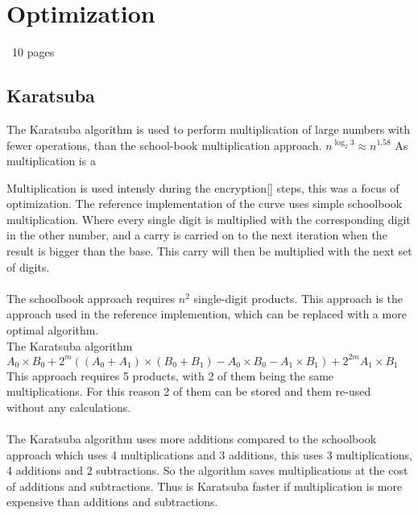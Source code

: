 \section{Optimization}
~10 pages

\subsection{Karatsuba}
The Karatsuba algorithm is used to perform multiplication of large numbers with fewer operations, than the school-book multiplication approach.
$n^{\log_{2}3} \approx n^{1.58}$
As multiplication is a 

Multiplication is used intensly during the encryption[] steps, this was a focus of optimization. The reference implementation of the curve uses simple schoolbook multiplication.
Where every single digit is multiplied with the corresponding digit in the other number, and a carry is carried on to the next iteration when the result is bigger than the base. This carry will then be multiplied with the next set of digits.\\
[EXAMPLE IMAGE]\\
The schoolbook approach requires $n^{2}$ single-digit products. 
This approach is the approach used in the reference implemention, which can be replaced with a more optimal algorithm.
\\

The Karatsuba algorithm 
$A_0 \times B_0 + 2^{m}((A_0 \plus A_1) \times (B_0 \plus B_1) - A_0 \times B_0 - A_1 \times B_1) + 2^{2m} A_1 \times B_1$
This approach requires 5 products, with 2 of them being the same multiplications. For this reason 2 of them can be stored and them re-used without any calculations.
\\[EXAMPLE IMAGE]\\
The Karatsuba algorithm uses more additions compared to the schoolbook approach which uses 4 multiplications and 3 additions, this uses 3 multiplications, 4 additions and 2 subtractions. So the algorithm saves multiplications at the cost of additions and subtractions. Thus is Karatsuba faster if multiplication is more expensive than additions and subtractions. 


